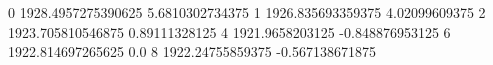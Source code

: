 0 1928.4957275390625 5.6810302734375
1 1926.835693359375 4.02099609375
2 1923.705810546875 0.89111328125
4 1921.9658203125 -0.848876953125
6 1922.814697265625 0.0
8 1922.24755859375 -0.567138671875
